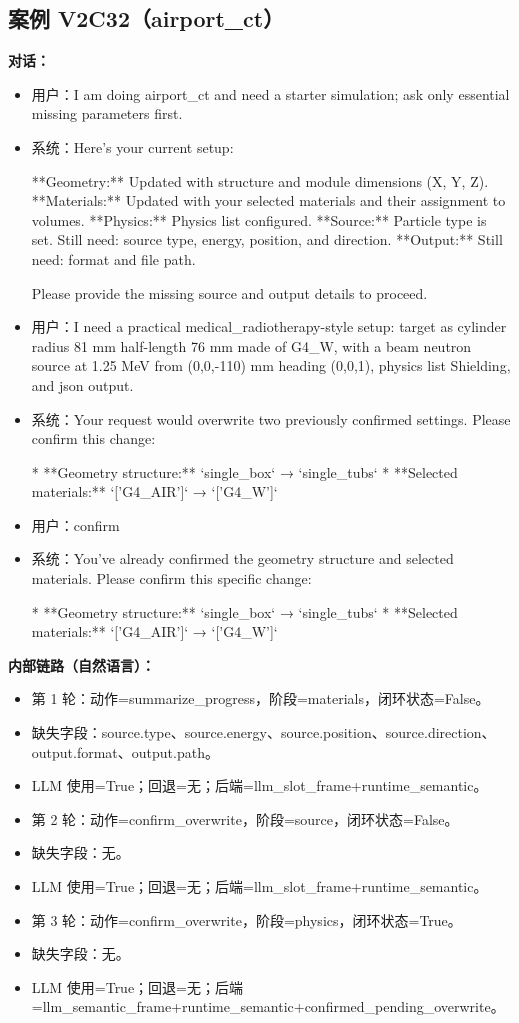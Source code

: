 \documentclass[11pt]{ctexart}
\begin{document}
\subsection{案例 V2C32（airport\_ct）}
\textbf{对话：}
\begin{itemize}
\item 用户：I am doing airport\_ct and need a starter simulation; ask only essential missing parameters first.
\item 系统：Here's your current setup:

**Geometry:** Updated with structure and module dimensions (X, Y, Z).
**Materials:** Updated with your selected materials and their assignment to volumes.
**Physics:** Physics list configured.
**Source:** Particle type is set. Still need: source type, energy, position, and direction.
**Output:** Still need: format and file path.

Please provide the missing source and output details to proceed.
\item 用户：I need a practical medical\_radiotherapy-style setup: target as cylinder radius 81 mm half-length 76 mm made of G4\_W, with a beam neutron source at 1.25 MeV from (0,0,-110) mm heading (0,0,1), physics list Shielding, and json output.
\item 系统：Your request would overwrite two previously confirmed settings. Please confirm this change:

*   **Geometry structure:** `single\_box` → `single\_tubs`
*   **Selected materials:** `['G4\_AIR']` → `['G4\_W']`
\item 用户：confirm
\item 系统：You've already confirmed the geometry structure and selected materials. Please confirm this specific change:

*   **Geometry structure:** `single\_box` → `single\_tubs`
*   **Selected materials:** `['G4\_AIR']` → `['G4\_W']`
\end{itemize}
\textbf{内部链路（自然语言）：}
\begin{itemize}
\item 第 1 轮：动作=summarize\_progress，阶段=materials，闭环状态=False。
\item 缺失字段：source.type、source.energy、source.position、source.direction、output.format、output.path。
\item LLM 使用=True；回退=无；后端=llm\_slot\_frame+runtime\_semantic。
\item 第 2 轮：动作=confirm\_overwrite，阶段=source，闭环状态=False。
\item 缺失字段：无。
\item LLM 使用=True；回退=无；后端=llm\_slot\_frame+runtime\_semantic。
\item 第 3 轮：动作=confirm\_overwrite，阶段=physics，闭环状态=True。
\item 缺失字段：无。
\item LLM 使用=True；回退=无；后端=llm\_semantic\_frame+runtime\_semantic+confirmed\_pending\_overwrite。
\end{itemize}
\end{document}

